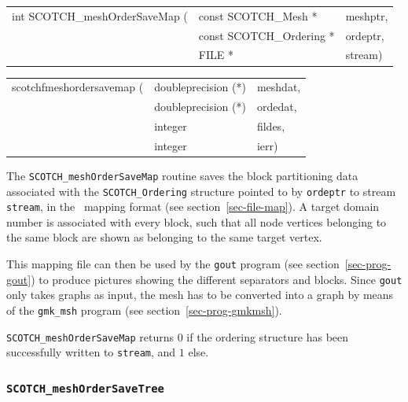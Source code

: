 \begin{itemize}
\progsyn

{\tt\begin{tabular}{l@{}ll}
int SCOTCH\_meshOrderSaveMap ( & const SCOTCH\_Mesh *     & meshptr, \\
                               & const SCOTCH\_Ordering * & ordeptr, \\
                               & FILE *                   & stream)
\end{tabular}}

{\tt\begin{tabular}{l@{}ll}
scotchfmeshordersavemap ( & doubleprecision (*) & meshdat, \\
                          & doubleprecision (*) & ordedat, \\
                          & integer             & fildes,  \\
                          & integer             & ierr)
\end{tabular}}

\progdes

The {\tt SCOTCH\_meshOrderSaveMap} routine saves the block
partitioning data associated with the {\tt SCOTCH\_\lbt Ordering}
structure pointed to by {\tt ordeptr} to stream {\tt stream},
in the \scotch\ mapping format (see section~\ref{sec-file-map}).
A target domain number is associated with every block, such that
all node vertices belonging to the same block are shown as belonging
to the same target vertex.

This mapping file can then be used by the {\tt gout} program
(see section~\ref{sec-prog-gout}) to produce pictures showing
the different separators and blocks. Since {\tt gout} only takes
graphs as input, the mesh has to be converted into a graph by
means of the {\tt gmk\_\lbt msh} program (see
section~\ref{sec-prog-gmkmsh}).

\progret

{\tt SCOTCH\_meshOrderSaveMap} returns $0$ if the ordering structure
has been successfully written to {\tt stream}, and $1$ else.
\end{itemize}

\subsubsection{{\tt SCOTCH\_meshOrderSaveTree}}

